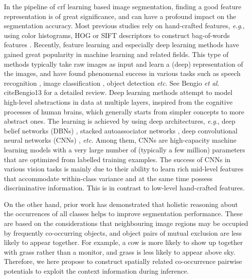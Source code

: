 \documentclass[10pt,3p]{elsarticle}
\def\onedot{.\xspace}
\def\eg{\emph{e.g}\onedot}
\def\etc{\emph{etc}\onedot}
\def\etal{\emph{et al}\onedot}
\newcommand{\crf}{{\sc crf}\xspace}
\begin{document}
In the pipeline of \crf learning based image segmentation, finding a good feature representation is of great significance, and can have a profound impact on the segmentation accuracy. Most previous studies rely on hand-crafted features, \eg, using color histograms, HOG or SIFT descriptors to construct bag-of-words features \cite{Fulkerson08,Fulkerson09,Lucchi12,Yao12,Lucchi13}.
Recently, feature learning and especially deep learning methods have gained great popularity
in machine learning and related fields.
This type of methods typically take raw images as input and learn a (deep) representation
of the images, and have found phenomenal success in various tasks such as speech recognition \cite{Hinton06}, image classification
\cite{deepCNN12,decaf13}, object detection \cite{Ross14} \etc See Bengio \etal \\cite{Bengio13} for a detailed
review.
Deep learning methods attempt to model high-level abstractions in data at multiple layers,
inspired from the cognitive processes of human brains, which generally starts from simpler
concepts to more abstract ones.
The learning is achieved by using deep architectures, \eg, deep belief networks (DBNs) \cite{Hinton06}, stacked autoassociator networks \cite{Bengio07},
deep convolutional
neural networks (CNNs)
\cite{Lecun98,deepCNN12,CVPR15b}, \etc
Among them, CNNs are high-capacity machine learning models with a very large number of (typically a
few million)
parameters that are optimized from labelled training examples.
The success of CNNs in various vision tasks \cite{Lecun98,deepCNN12} is mainly
due to their ability to learn rich mid-level features that accommodate within-class
variance and at the same time possess discriminative information.
This is in  contrast to low-level hand-crafted features.


On the other hand, prior work \cite{Rabinovich07,Ladicky13,Roy14} has demonstrated that holistic reasoning about the occurrences of all classes helps to improve segmentation performance.
These are based on the considerations that neighbouring image regions may be occupied by frequently co-occurring objects, and object pairs of mutual exclusion are less likely to appear together.
For example, a cow is more likely to show up together with grass rather than a monitor, and grass is less likely to appear above sky.
Therefore, we here propose to construct spatially related co-occurrence pairwise potentials to exploit the context information during inference.
\end{document}
